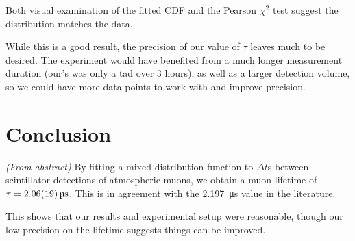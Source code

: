 \documentclass[a4paper]{scrartcl}
\begin{document}
Both visual examination of the fitted CDF and the Pearson \(\chi^2\) test suggest the distribution matches the data.

While this is a good result, the precision of our value of \(\tau\) leaves much to be desired. The experiment would have benefited from a much longer measurement duration (our's was only a tad over 3 hours), as well as a larger detection volume, so we could have more data points to work with and improve precision.

\section{Conclusion}
\emph{(From abstract)} By fitting a mixed distribution function to \(\Delta t\)s between scintillator detections of atmospheric muons, we obtain a muon lifetime of \(\tau = \SI{2.06 \pm 0.19}{\micro\second}\). This is in agreement with the \SI{2.197}{\micro\second} value in the literature\cite{Olive:2016xmw}.

This shows that our results and experimental setup were reasonable, though our low precision on the lifetime suggests things can be improved.

\printbibliography
\end{document}
